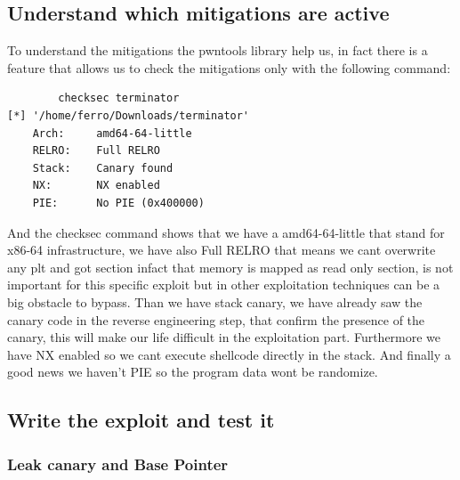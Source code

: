     \clearpage
    \subsection{Understand which mitigations are active}
To understand the mitigations the pwntools library help us, in fact there is a feature that allows us to check the mitigations only with the following command:
    \begin{verbatim}
        checksec terminator                                     
[*] '/home/ferro/Downloads/terminator'
    Arch:     amd64-64-little
    RELRO:    Full RELRO
    Stack:    Canary found
    NX:       NX enabled
    PIE:      No PIE (0x400000)
    \end{verbatim}
    And the checksec command shows that we have a amd64-64-little that stand for x86-64 infrastructure, we have also Full RELRO that means we cant overwrite any plt and got section infact that memory is mapped as read only section, is not important for this specific exploit but in other exploitation techniques can be a big obstacle to bypass.\newline
    Than we have stack canary, we have already saw the canary code in the reverse engineering step, that confirm the presence of the canary, this will make our life difficult in the exploitation part.\newline
    Furthermore we have NX enabled so we cant execute shellcode directly in the stack.\newline
    And finally a good news we haven't PIE so the program data wont be randomize.\newline
    \subsection{Write the exploit and test it}
    \subsubsection{Leak canary and Base Pointer}

